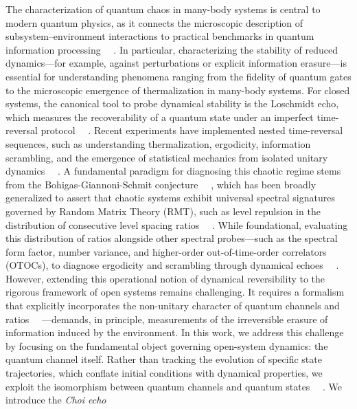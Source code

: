 \documentclass[pra,twocolumn,aps,showpacs,superscriptaddress,longbibliography]{revtex4-2}%
\providecommand{\DIFadd}[1]{{\protect\color{blue} \sf #1}} %
\providecommand{\DIFdel}[1]{{\protect\color{red} \scriptsize #1}} %
\providecommand{\DIFaddbegin}{} %
\providecommand{\DIFaddend}{} %
\providecommand{\DIFdelbegin}{} %
\providecommand{\DIFdelend}{} %
\begin{document}
\DIFadd{The characterization of quantum chaos in many-body systems }\DIFaddend is central to \DIFdelbegin \DIFdel{modern quantum physics, as it connects the microscopic description of subsystem--environment interactions to practical benchmarks in quantum information processing~\mbox{%
\cite{nielsen_2010_quantum, breuer_2002_theory}}\hskip0pt%
. In particular, characterizing the stability of reduced dynamics---for example, against perturbations or explicit information erasure---is essential for understanding phenomena ranging from the fidelity of quantum gates to the microscopic emergence of thermalization in many-body systems.
For closed systems, the canonical tool to probe dynamical stability is the Loschmidt echo, which measures the recoverability of a quantum state under an imperfect time-reversal protocol~\mbox{%
\cite{peres_1984_stability, gorin_2006_dynamics}}\hskip0pt%
. 
Recent experiments have implemented nested time-reversal sequences, such as }\DIFdelend \DIFaddbegin \DIFadd{understanding thermalization, ergodicity, information scrambling, and the emergence of statistical mechanics from isolated unitary dynamics~\mbox{%
\cite{dalessio_2016_quantum}}\hskip0pt%
. A fundamental paradigm for diagnosing this chaotic regime stems from the Bohigas-Giannoni-Schmit conjecture~\mbox{%
\cite{bohigas_1984_characterization}}\hskip0pt%
, which has been broadly generalized to assert that chaotic systems exhibit universal spectral signatures governed by Random Matrix Theory (RMT), such as level repulsion in the distribution of consecutive level spacing ratios~\mbox{%
\cite{oganesyan_2007_localization, atas_2013_distribution}}\hskip0pt%
. 
While foundational, evaluating this distribution of ratios alongside other spectral probes---such as the spectral form factor, number variance, and }\DIFaddend higher-order \DIFdelbegin \DIFdel{out-of-time-order correlators (OTOCs), to diagnose ergodicity and scrambling through dynamical echoes~\mbox{%
\cite{googleecho2025}}\hskip0pt%
. However, extending this operational notion of dynamical reversibility to the rigorous framework of open systems remains challenging. It requires a formalism that explicitly incorporates the non-unitary character of quantum channels and }\DIFdelend \DIFaddbegin \DIFadd{ratios~\mbox{%
\cite{mehta_2004_random,tekur_2020_symmetry,haake_2001_quantum}}\hskip0pt%
---demands, in principle, measurements of }\DIFaddend the \DIFdelbegin \DIFdel{irreversible erasure of information induced by the environment.
In this work, we address this challenge by focusing on the fundamental object governing open-system dynamics: the quantum channel itself.
Rather than tracking the evolution of specific state trajectories, which conflate initial conditions with dynamical properties, we exploit the isomorphism between quantum channels and quantum states~\mbox{%
\cite{jamiolkowski_1972_linear, choi_1975_completely}}\hskip0pt%
. We introduce the }\textit{\DIFdel{Choi echo}} %
\end{document}
